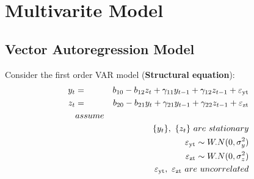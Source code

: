 \section{Multivarite Model}
\subsection{Vector Autoregression Model}
Consider the first order VAR model (\textbf{Structural equation}):
\begin{eqnarray*}
  y_t & = & b_{10} - b_{12} z_t + \gamma_{11} y_{t - 1} + \gamma_{12} z_{t -
  1} + \varepsilon_{\tmop{yt}}\\
  z_t & = & b_{20} - b_{21} y_t + \gamma_{21} y_{t - 1} + \gamma_{22} z_{t -
  1} + \varepsilon_{\tmop{zt}}\\
&assume&\\
&&\{y_t \}, \ \{z_t \} \ are \ stationary\\
&&\varepsilon_{\tmop{yt}} \sim W.N (0, \sigma_y^2)\\
&&\varepsilon_{\tmop{zt}} \sim W.N (0, \sigma_z^2)\\
&&\varepsilon_{\tmop{yt}}, \ \varepsilon_{\tmop{zt}}\  are \ uncorrelated
\end{eqnarray*}

